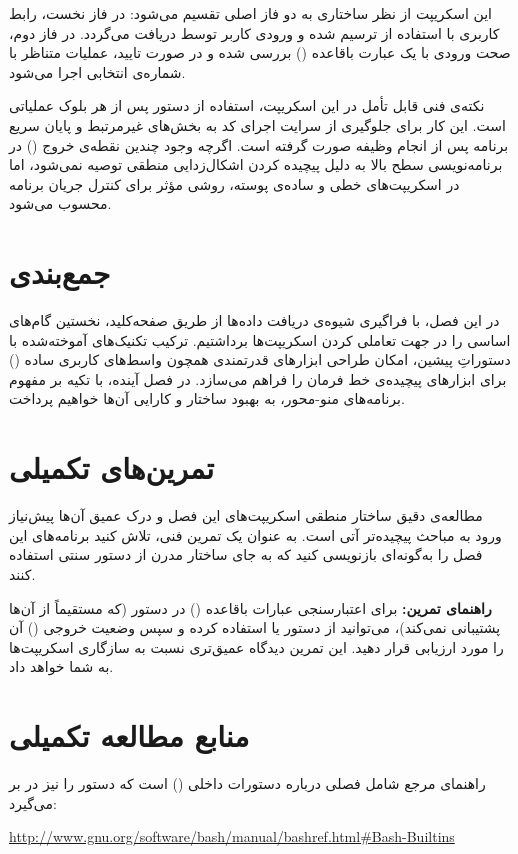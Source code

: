 این اسکریپت از نظر ساختاری به دو فاز اصلی تقسیم می‌شود: در فاز نخست، رابط کاربری با استفاده از  ترسیم شده و ورودی کاربر توسط  دریافت می‌گردد. در فاز دوم، صحت ورودی با یک عبارت باقاعده (\cmd{\^{}[0-3]\$}) بررسی شده و در صورت تایید، عملیات متناظر با شماره‌ی انتخابی اجرا می‌شود.

نکته‌ی فنی قابل تأمل در این اسکریپت، استفاده از دستور  پس از هر بلوک عملیاتی است. این کار برای جلوگیری از سرایت اجرای کد به بخش‌های غیرمرتبط و پایان سریع برنامه پس از انجام وظیفه صورت گرفته است. اگرچه وجود چندین نقطه‌ی خروج () در برنامه‌نویسی سطح بالا به دلیل پیچیده کردن اشکال‌زدایی منطقی توصیه نمی‌شود، اما در اسکریپت‌های خطی و ساده‌ی پوسته، روشی مؤثر برای کنترل جریان برنامه محسوب می‌شود.

\section{جمع‌بندی}

در این فصل، با فراگیری شیوه‌ی دریافت داده‌ها از طریق صفحه‌کلید، نخستین گام‌های اساسی را در جهت تعاملی کردن اسکریپت‌ها برداشتیم. ترکیب تکنیک‌های آموخته‌شده با دستوراتِ پیشین، امکان طراحی ابزارهای قدرتمندی همچون واسط‌های کاربری ساده () برای ابزارهای پیچیده‌ی خط فرمان را فراهم می‌سازد. در فصل آینده، با تکیه بر مفهوم برنامه‌های منو-محور، به بهبود ساختار و کارایی آن‌ها خواهیم پرداخت.

\section{تمرین‌های تکمیلی}

مطالعه‌ی دقیق ساختار منطقی اسکریپت‌های این فصل و درک عمیق آن‌ها پیش‌نیاز ورود به مباحث پیچیده‌تر آتی است. به عنوان یک تمرین فنی، تلاش کنید برنامه‌های این فصل را به‌گونه‌ای بازنویسی کنید که به جای ساختار مدرن \cmd{[[ ]]} از دستور سنتی  استفاده کنند.

\textbf{راهنمای تمرین:} برای اعتبارسنجی عبارات باقاعده () در دستور  (که مستقیماً از آن‌ها پشتیبانی نمی‌کند)، می‌توانید از دستور  یا  استفاده کرده و سپس وضعیت خروجی () آن را مورد ارزیابی قرار دهید. این تمرین دیدگاه عمیق‌تری نسبت به سازگاری اسکریپت‌ها به شما خواهد داد.

\section{منابع مطالعه تکمیلی}

راهنمای مرجع  شامل فصلی درباره دستورات داخلی () است که دستور  را نیز در بر می‌گیرد:

\begin{latin}
\url{http://www.gnu.org/software/bash/manual/bashref.html#Bash-Builtins}
\end{latin}